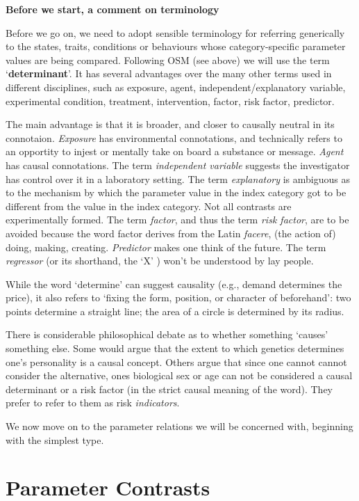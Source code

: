 \documentclass[]{book}
\begin{document}
\textbf{Before we start, a comment on terminology}

Before we go on, we need to adopt sensible terminology for referring generically to the states, traits, conditions or behaviours whose category-specific parameter values are being compared. Following OSM (see above) we will use the term `\textbf{determinant}'. It has several advantages over the many other terms used in different disciplines, such as exposure, agent, independent/explanatory variable, experimental condition, treatment, intervention, factor, risk factor, predictor.

The main advantage is that it is broader, and closer to causally neutral in its connotaion. \emph{Exposure} has environmental connotations, and technically refers to an opportity to injest or mentally take on board a substance or message. \emph{Agent} has causal connotations. The term \emph{independent variable} suggests the investigator has control over it in a laboratory setting. The term \emph{explanatory} is ambiguous as to the mechanism by which the parameter value in the index category got to be different from the value in the index category. Not all contrasts are experimentally formed. The term \emph{factor}, and thus the term \emph{risk factor}, are to be avoided because the word factor derives from the Latin \emph{facere}, (the action of) doing, making, creating. \emph{Predictor} makes one think of the future. The term \emph{regressor} (or its shorthand, the `X' ) won't be understood by lay people.

While the word `determine' can suggest causality (e.g., demand determines the price), it also refers to `fixing the form, position, or character of beforehand': two points determine a straight line; the area of a circle is determined by its radius.

There is considerable philosophical debate as to whether something `causes' something else. Some would argue that the extent to which genetics determines one's personality is a causal concept. Others argue that since one cannot cannot consider the alternative, ones biological sex or age can not be considered a causal determinant or a risk factor (in the strict causal meaning of the word). They prefer to refer to them as risk \emph{indicators}.

We now move on to the parameter relations we will be concerned with, beginning with the simplest type.

\hypertarget{parameter-contrasts}{%
\section{Parameter Contrasts}\label{parameter-contrasts}}
\end{document}
